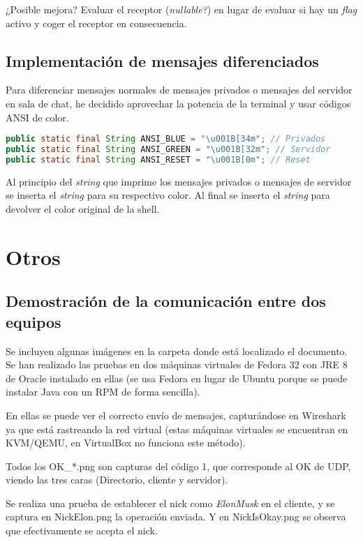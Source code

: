 \documentclass{article}
\begin{document}
¿Posible mejora? Evaluar el receptor (\textit{nullable?}) en lugar de evaluar si hay un \textit{flag} activo y coger el receptor en consecuencia.

\subsection{Implementación de mensajes diferenciados}

Para diferenciar mensajes normales de mensajes privados o mensajes del servidor en sala de chat, he decidido aprovechar la potencia de la terminal y usar códigos ANSI de color.

\begin{lstlisting}[language=Java, caption=Colores]
public static final String ANSI_BLUE = "\u001B[34m"; // Privados
public static final String ANSI_GREEN = "\u001B[32m"; // Servidor
public static final String ANSI_RESET = "\u001B[0m"; // Reset
\end{lstlisting}

Al principio del \textit{string} que imprime los mensajes privados o mensajes de servidor se inserta el \textit{string} para su respectivo color. Al final se inserta el \textit{string} para devolver el color original de la shell.

\section{Otros}


\subsection{Demostración de la comunicación entre dos equipos}

Se incluyen algunas imágenes en la carpeta donde está localizado el documento. Se han realizado las pruebas en dos máquinas virtuales de Fedora 32 con JRE 8 de Oracle instalado en ellas (se usa Fedora en lugar de Ubuntu porque se puede instalar Java con un RPM de forma sencilla).

En ellas se puede ver el correcto envío de mensajes, capturándose en Wireshark ya que está rastreando la red virtual (estas máquinas virtuales se encuentran en KVM/QEMU, en VirtualBox no funciona este método).

Todos los OK\_*.png son capturas del código 1, que corresponde al OK de UDP, viendo las tres caras (Directorio, cliente y servidor).

Se realiza una prueba de establecer el nick como \textit{ElonMusk} en el cliente, y se captura en NickElon.png la operación enviada. Y en NickIsOkay.png se observa que efectivamente se acepta el nick.
\end{document}
